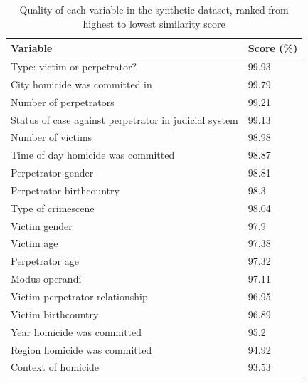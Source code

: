 \begin{table}[H]
\centering
\small
\begin{tabular}{@{}ll@{}}
\toprule
Variable                                              & Score (\%)   \\ \midrule
Type: victim or perpetrator?                          & 99.93 \\
City homicide was committed in                        & 99.79 \\
Number of perpetrators                                & 99.21 \\
Status of case against perpetrator in judicial system & 99.13 \\
Number of victims                                     & 98.98 \\
Time of day homicide was committed                    & 98.87 \\
Perpetrator gender                                    & 98.81 \\
Perpetrator birthcountry                              & 98.3  \\
Type of crimescene                                    & 98.04 \\
Victim gender                                         & 97.9  \\
Victim age                                            & 97.38 \\
Perpetrator age                                       & 97.32 \\
Modus operandi                                        & 97.11 \\
Victim-perpetrator relationship                       & 96.95 \\
Victim birthcountry                                   & 96.89 \\
Year homicide was committed                           & 95.2  \\ 
Region homicide was committed                         & 94.92 \\
Context of homicide                                   & 93.53 \\ \bottomrule
\end{tabular}
\caption{Quality of each variable in the synthetic dataset, ranked from highest to lowest similarity score}
\label{tab:my-table}
\end{table}


